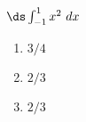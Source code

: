 {$\ds \int_{-1}^1 x^2\ dx$}
{\begin{enumerate}
\item		$3/4$
\item		$2/3$
\item		$2/3$
\end{enumerate}
}